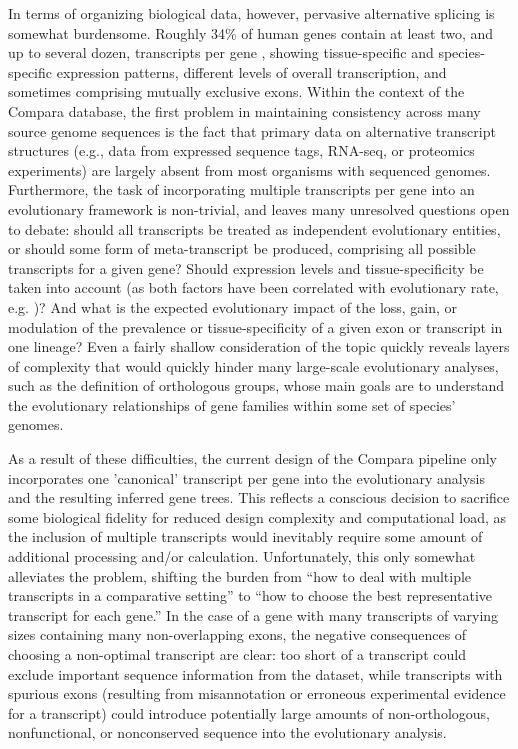 In terms of organizing biological data, however, pervasive alternative
splicing is somewhat burdensome. Roughly 34\% of human genes contain
at least two, and up to several dozen, transcripts per gene
\citep{Mironov1999}, showing tissue-specific and species-specific
expression patterns, different levels of overall transcription, and
sometimes comprising mutually exclusive exons. Within the context of
the Compara database, the first problem in maintaining consistency
across many source genome sequences is the fact that primary data on
alternative transcript structures (e.g., data from expressed sequence
tags, RNA-seq, or proteomics experiments) are largely absent from most
organisms with sequenced genomes. Furthermore, the task of
incorporating multiple transcripts per gene into an evolutionary
framework is non-trivial, and leaves many unresolved questions open to
debate: should all transcripts be treated as independent evolutionary
entities, or should some form of meta-transcript be produced,
comprising all possible transcripts for a given gene? Should
expression levels and tissue-specificity be taken into account (as
both factors have been correlated with evolutionary rate,
e.g. \citep{Koonin2006a,Zhu2008})? And what is the expected
evolutionary impact of the loss, gain, or modulation of the prevalence
or tissue-specificity of a given exon or transcript in one lineage?
Even a fairly shallow consideration of the topic quickly reveals
layers of complexity that would quickly hinder many large-scale
evolutionary analyses, such as the definition of orthologous groups,
whose main goals are to understand the evolutionary relationships of
gene families within some set of species' genomes.

As a result of these difficulties, the current design of the Compara
pipeline only incorporates one 'canonical' transcript per gene into
the evolutionary analysis and the resulting inferred gene trees. This
reflects a conscious decision to sacrifice some biological fidelity
for reduced design complexity and computational load, as the inclusion
of multiple transcripts would inevitably require some amount of
additional processing and/or calculation. Unfortunately, this only
somewhat alleviates the problem, shifting the burden from ``how to
deal with multiple transcripts in a comparative setting'' to ``how to
choose the best representative transcript for each gene.'' In the case
of a gene with many transcripts of varying sizes containing many
non-overlapping exons, the negative consequences of choosing a
non-optimal transcript are clear: too short of a transcript could
exclude important sequence information from the dataset, while
transcripts with spurious exons (resulting from misannotation or
erroneous experimental evidence for a transcript) could introduce
potentially large amounts of non-orthologous, nonfunctional, or
nonconserved sequence into the evolutionary analysis.

